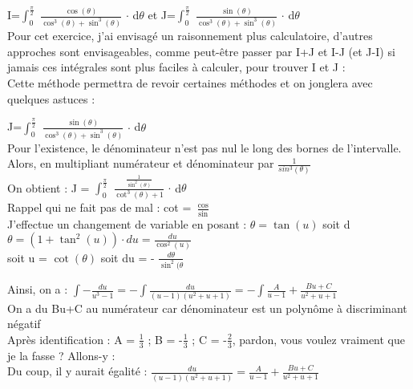 \documentclass[a4paper,10pt]{article}
\begin{document}
  I=$\int_0^{\frac{\pi}{2}}$ $\frac{\cos(\theta)}{\cos^3(\theta)+\sin^3(\theta)}$ $\cdot$ d$\theta$ et J=$\int_0^{\frac{\pi}{2}}$ $\frac{\sin(\theta)}{\cos^3(\theta)+\sin^3(\theta)}$ $\cdot$ d$\theta$ \\

Pour cet exercice, j'ai envisagé un raisonnement plus calculatoire, d'autres approches sont envisageables, comme peut-être passer par I+J et I-J (et J-I) si jamais ces intégrales sont plus faciles à calculer, pour trouver I et J : \\

Cette méthode permettra de revoir certaines méthodes et on jonglera avec quelques astuces : 

J=$\int_0^{\frac{\pi}{2}}$ $\frac{\sin(\theta)}{\cos^3(\theta)+\sin^3(\theta)}$ $\cdot$ d$\theta$ \\ 

Pour l'existence, le dénominateur n'est pas nul le long des bornes de l'intervalle. \\

Alors, en multipliant numérateur et dénominateur par $\frac{1}{sin^3(\theta)}$ \\

On obtient : J = $\int_0^{\frac{\pi}{2}}$ $\frac{\frac{1}{\sin^2(\theta)}}{\cot^3(\theta)+1}$ $\cdot$ d$\theta$ \\

Rappel qui ne fait pas de mal : cot = $\frac{\cos}{\sin}$ \\

J'effectue un changement de variable en posant : $\theta = \tan(u)$ soit d$\theta = (1 + \tan^2(u)) \cdot du = \frac{du}{\cos^2(u)}$ \\
soit u = $\cot(\theta)$ soit du = - $\frac{d\theta}{\sin^2(\theta}$

Ainsi, on a : $\int - \frac{du}{u^3-1} = - \int \frac{du}{(u-1)(u^2+u+1)} = - \int \frac{A}{u-1} + \frac{Bu+C}{u^2+u+1}$ \\
On a du Bu+C au numérateur car dénominateur est un polynôme à discriminant négatif \\

Après identification : A = $\frac{1}{3}$ ; B = -$\frac{1}{3}$ ; C = -$\frac{2}{3}$, pardon, vous voulez vraiment que je la fasse ? Allons-y : \\

Du coup, il y aurait égalité : $\frac{du}{(u-1)(u^2+u+1)} = \frac{A}{u-1} + \frac{Bu+C}{u^2+u+1}$ \\
\end{document}
